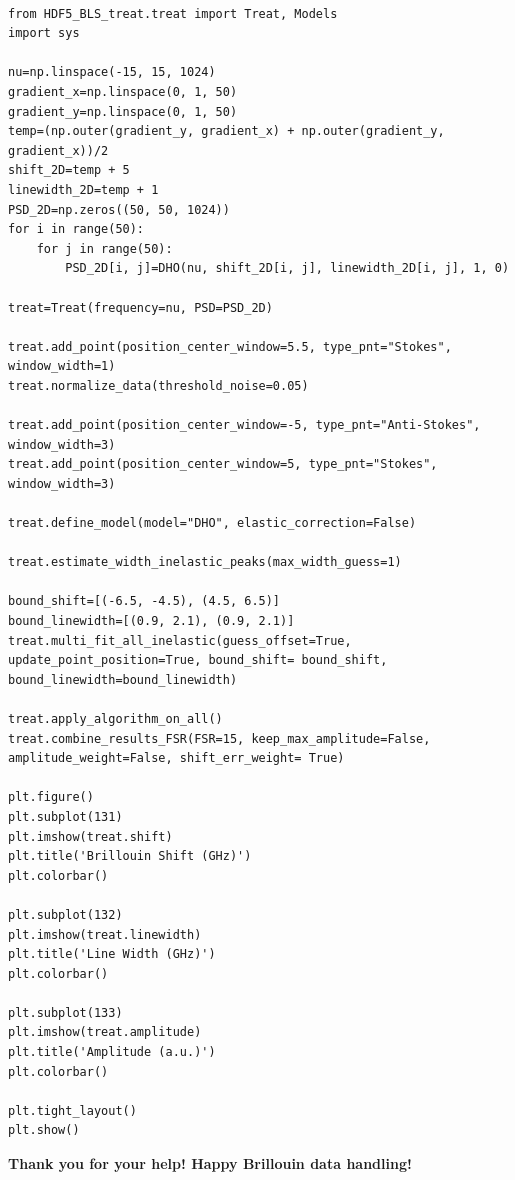 \documentclass{article}
\begin{document}
\begin{lstlisting}

from HDF5_BLS_treat.treat import Treat, Models
import sys

nu=np.linspace(-15, 15, 1024)
gradient_x=np.linspace(0, 1, 50)
gradient_y=np.linspace(0, 1, 50)
temp=(np.outer(gradient_y, gradient_x) + np.outer(gradient_y, gradient_x))/2
shift_2D=temp + 5
linewidth_2D=temp + 1 
PSD_2D=np.zeros((50, 50, 1024))
for i in range(50):
    for j in range(50):
        PSD_2D[i, j]=DHO(nu, shift_2D[i, j], linewidth_2D[i, j], 1, 0) 

treat=Treat(frequency=nu, PSD=PSD_2D)

treat.add_point(position_center_window=5.5, type_pnt="Stokes", window_width=1)
treat.normalize_data(threshold_noise=0.05)

treat.add_point(position_center_window=-5, type_pnt="Anti-Stokes", window_width=3)
treat.add_point(position_center_window=5, type_pnt="Stokes", window_width=3)

treat.define_model(model="DHO", elastic_correction=False)

treat.estimate_width_inelastic_peaks(max_width_guess=1)

bound_shift=[(-6.5, -4.5), (4.5, 6.5)]
bound_linewidth=[(0.9, 2.1), (0.9, 2.1)]
treat.multi_fit_all_inelastic(guess_offset=True, update_point_position=True, bound_shift= bound_shift, bound_linewidth=bound_linewidth)  

treat.apply_algorithm_on_all()
treat.combine_results_FSR(FSR=15, keep_max_amplitude=False, amplitude_weight=False, shift_err_weight= True)

plt.figure()
plt.subplot(131)
plt.imshow(treat.shift)
plt.title('Brillouin Shift (GHz)')
plt.colorbar()

plt.subplot(132)
plt.imshow(treat.linewidth)
plt.title('Line Width (GHz)')
plt.colorbar()

plt.subplot(133)
plt.imshow(treat.amplitude)
plt.title('Amplitude (a.u.)')
plt.colorbar()

plt.tight_layout()
plt.show()
\end{lstlisting}

\begin{center}
\textbf{Thank you for your help! Happy Brillouin data handling!}
\end{center}
\end{document}

